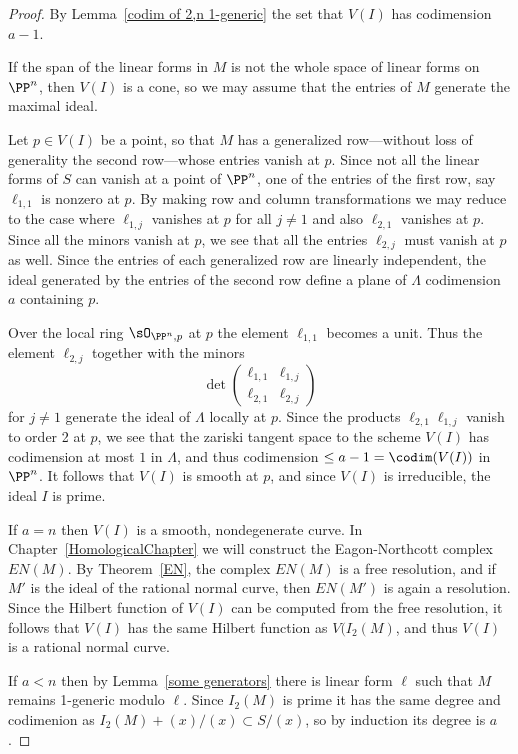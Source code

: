\begin{proof}  By Lemma~\ref{codim of 2,n 1-generic} the set that $V(I)$ has codimension $a-1$.


If the span of the linear forms in $M$ is not the whole space of linear forms on $\PP^n$, then $V(I)$ is a cone,
so we may assume that the entries of $M$ generate the maximal ideal.

 Let $p\in V(I)$ be a point, so that $M$ has a generalized row---without loss of generality the second row---whose 
 entries vanish
at $p$. Since not all the linear forms
of $S$ can vanish at a point of $\PP^n$, one of the entries of the first row, say $\ell_{1,1}$ is nonzero
at $p$. By making row and column transformations we may reduce to the case where
$\ell_{1,j}$ vanishes at $p$ for all $j\neq 1$ and also $\ell_{2,1}$ vanishes at $p$. Since all the minors
vanish at $p$, we see that all the entries $\ell_{2,j}$ must vanish at $p$ as well. Since the entries
of each generalized row are linearly independent, the ideal generated by the entries of the second row define a plane of
$\Lambda$ codimension $a$ containing $p$. 

Over the local ring $\sO_{\PP^n, p}$ at $p$ the element $\ell_{1,1}$ becomes a unit.
Thus the element $\ell_{2,j}$ together with the minors 
$$
\det 
\begin{pmatrix}
\ell_{1,1}& \ell_{1,j}\\
\ell_{2,1}& \ell_{2,j}
\end{pmatrix}
$$
for $j\neq 1$ generate the ideal of $\Lambda$ locally at $p$. Since the products
$\ell_{2,1}\ell_{1,j}$ vanish to order 2 at $p$, we see that the zariski tangent space to the scheme $V(I)$
has codimension at most $1$ in $\Lambda$, and thus codimension $\leq a-1 = \codim (V(I))$ in $\PP^n$. It follows that $V(I)$ is smooth at $p$, and since $V(I)$ is
irreducible, the ideal $I$ is prime.

If $a=n$ then $V(I)$ is a smooth, nondegenerate curve. In Chapter~\ref{HomologicalChapter} we will construct the Eagon-Northcott complex $EN(M)$. By Theorem~\ref{EN}, the complex $EN(M)$ is a free resolution,
and if $M'$ is the ideal of the rational normal curve, then $EN(M')$ is again a resolution. Since the Hilbert
function of $V(I)$ can be computed from the free resolution, it follows that $V(I)$ has the same Hilbert function
as $V(I_2(M)$, and thus $V(I)$ is a rational normal curve.

If $a<n$ then by Lemma~\ref{some generators} there is linear form $\ell$ such that $M$ remains 1-generic modulo $\ell$.
Since $I_2(M)$ is prime it has the same degree and codimenion as $I_2(M) +(x)/(x) \subset S/(x)$, so by induction its degree
is $a$.
\end{proof}

